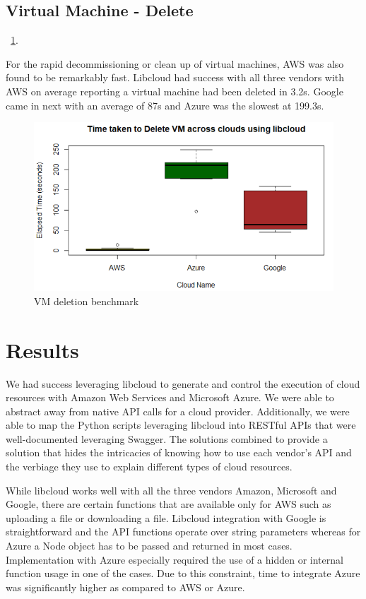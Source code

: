 \subsection{Virtual Machine - Delete}~\ref{F:vm-delete}.

For the rapid decommissioning or clean up of virtual machines, AWS was also found to be remarkably fast. Libcloud had success with all three vendors with AWS on average reporting a virtual machine had been deleted in 3.2s. Google came in next with an average of 87s and Azure was the slowest at 199.3s.

\begin{figure}[!ht]
  \centering
  \includegraphics[width=\columnwidth]{images/DeleteVM.png}
  \caption{VM deletion benchmark}\label{F:vm-delete}
\end{figure}

\section{Results}
We had success leveraging libcloud to generate and control the execution of
cloud resources with Amazon Web Services and Microsoft Azure. We were able to
abstract away from native API calls for a cloud provider. Additionally, we were
able to map the Python scripts leveraging libcloud into RESTful APIs that were
well-documented leveraging Swagger. The solutions combined to provide a
solution that hides the intricacies of knowing how to use each vendor's API and
the verbiage they use to explain different types of cloud resources. 

While libcloud works well with all the three vendors Amazon, Microsoft and Google,
there are certain functions that are available only for AWS such as uploading
a file or downloading a file. Libcloud integration with Google is straightforward
and the API functions operate over string parameters whereas for Azure a Node
object has to be passed and returned in most cases. Implementation with Azure
especially required the use of a hidden or internal function usage in one of the
cases. Due to this constraint, time to integrate Azure was significantly higher as compared
to AWS or Azure.

